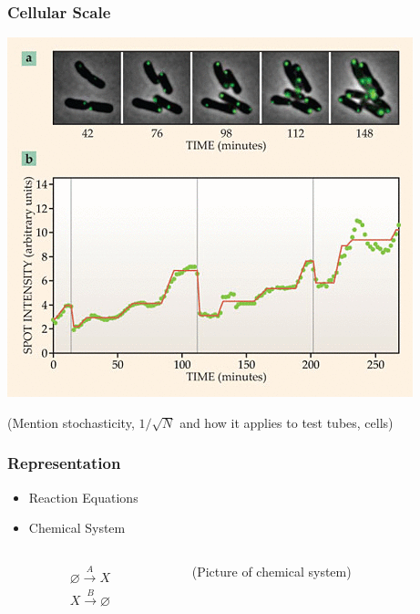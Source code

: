 \documentclass[xcolor={usenames,dvipsnames,svgnames}]{beamer}
\begin{document}
\begin{frame}
    \frametitle{Cellular Scale}

    \begin{center}
        \includegraphics[height=0.6\textheight]{cell-stochasticity.png} \footnotesize{\cite{decision-making}}
    \end{center}

    (Mention stochasticity, $1/\sqrt{N}$ and how it applies to test tubes, cells)
\end{frame}

\begin{frame}
    \frametitle{Representation}
    \begin{itemize}
        \item Reaction Equations
        \item Chemical System
    \end{itemize}
    \begin{columns}[c]
        \begin{column}{0.5\textwidth}
            \begin{align*}
                \varnothing \xrightarrow{A} X \\
                X \xrightarrow {B} \varnothing
            \end{align*}
        \end{column}
        \begin{column}{0.5\textwidth}
            (Picture of chemical system)
        \end{column}
    \end{columns}
\end{frame}
\end{document}
